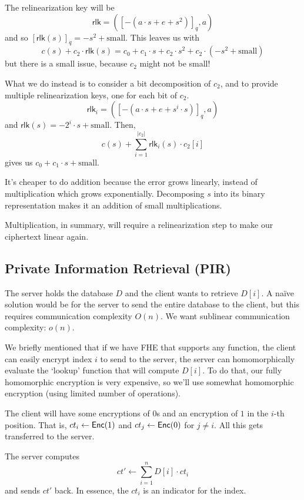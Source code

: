The relinearization key will be
\[\mathsf{rlk} = \left( [-(a\cdot s + e + s^2)]_q, a \right)\]
and so $[\mathsf{rlk}(s)]_q = -s^2 + \text{small}$. This leaves us with
\[c(s) + c_2 \cdot \mathsf{rlk}(s) = c_0 + c_1\cdot s + c_2\cdot s^2 + c_2\cdot (-s^2 + \text{small})\]
but there is a small issue, because $c_2$ might not be small!

What we do instead is to consider a bit decomposition of $c_2$, and to provide multiple relinearization keys, one for each bit of $c_2$.
\[\mathsf{rlk}_i = ([-(a\cdot s + e + s^i\cdot s)]_q, a)\]
and $\mathsf{rlk}(s) = -2^i\cdot s + \text{small}$. Then,
\[c(s) + \sum^{|c_2|}_{i=1}\mathsf{rlk}_i(s)\cdot c_2[i]\]
gives us $c_0 + c_1\cdot s + \text{small}$.

It's cheaper to do addition because the error grows linearly, instead of multiplication which grows exponentially. Decomposing $s$ into its binary representation makes it an addition of small multiplications.

Multiplication, in summary, will require a relinearization step to make our ciphertext linear again.

\subsection{Private Information Retrieval (PIR)}

The server holds the database $D$ and the client wants to retrieve $D[i]$. A na\"ive solution would be for the server to send the entire database to the client, but this requires communication complexity $O(n)$. We want sublinear communication complexity: $o(n)$.

We briefly mentioned that if we have FHE that supports any function, the client can easily encrypt index $i$ to send to the server, the server can homomorphically evaluate the `lookup' function that will compute $D[i]$. To do that, our fully homomorphic encryption is very expensive, so we'll use somewhat homomorphic encryption (using limited number of operations).

The client will have some encryptions of $0$s and an encryption of $1$ in the $i$-th position. That is, $ct_i \leftarrow \operatorname{\mathsf{Enc}}(1)$ and $ct_j \leftarrow \operatorname{\mathsf{Enc}}(0)$ for $j\neq i$. All this gets transferred to the server.

The server computes
\[ct'\leftarrow \sum^n_{i=1}D[i]\cdot ct_i\]
and sends $ct'$ back. In essence, the $ct_i$ is an indicator for the index.

